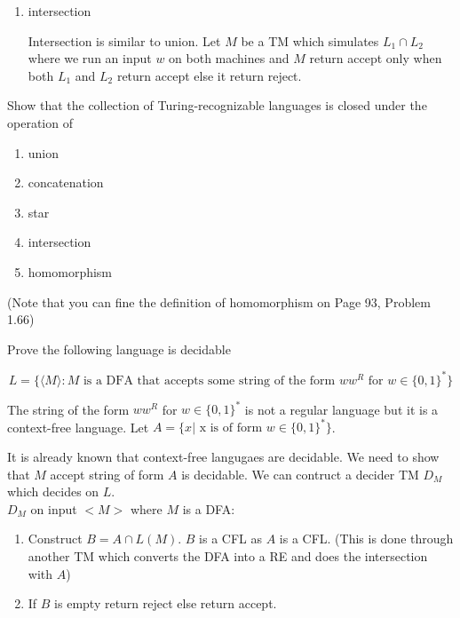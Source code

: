 \documentclass[12pt]{exam}
\begin{document}
\begin{questions}
\begin{solution}
\begin{enumerate}
      \item intersection

            Intersection is similar to union. Let $M$ be a TM which simulates $L_{1}\cap L_{2}$  where we run an input $w$ on both machines and $M$ return accept only when both $L_{1}$ and $L_{2}$ return accept else it return reject.

    \end{enumerate}

  \end{solution}
  \question{} %
  Show that the collection of Turing-recognizable languages is closed under the operation of

  \begin{multicols}{2}
  \begin{enumerate}
    \item union
    \item concatenation
    \item star
    \item intersection
    \item homomorphism
  \end{enumerate}
  \end{multicols}

  (Note that you can fine the definition of homomorphism on Page 93, Problem 1.66)


  \question{} %
  Prove the following language is decidable

  \[L=\{\langle M \rangle :M\text{ is a DFA that accepts some string of the form } ww^{R} \text{ for } w\in \{0,1\}^{*}\}\]

  \begin{solution}

    The string of the form $ww^{R}$ for $w\in \{0,1\}^{*}$ is not a regular language but it is a context-free language. Let $A = \{ x| \text{ x is of form } w\in \{0,1\}^{*} \}$.

    It is already known that context-free langugaes are decidable. We need to show that $M$ accept string of form $A$ is decidable. We can contruct a decider TM $D_{M}$ which decides on $L$.\\
    $D_{M}$ on input $<M>$ where $M$ is a DFA:
    \begin{enumerate}
      \item Construct $B=A\cap L(M)$. $B$ is a CFL as $A$ is a CFL. (This is done through another TM which converts the DFA into a RE and does the intersection with $A$)
      \item If $B$ is empty return reject else return accept.
    \end{enumerate}


\end{solution}
\end{questions}
\end{document}

